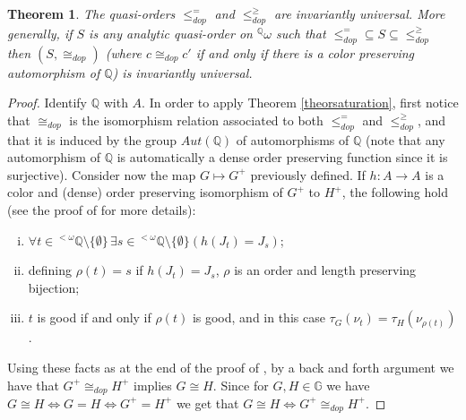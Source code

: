 \documentclass{amsart}
\newtheorem{theorem}{Theorem}[section]
\theoremstyle{definition}
\theoremstyle{remark}
\begin{document}
\begin{theorem}\label{theordopuniversal}
The quasi-orders $\leq_{dop}^=$ and $\leq_{dop}^\geq$ are invariantly
universal. More generally, if $S$ is any analytic quasi-order on
${}^{\mathbb{Q}} \omega$ such that $\leq_{dop}^= \subseteq S \subseteq
\leq_{dop}^\geq$ then $(S, \cong_{dop})$ (where $c \cong_{dop} c'$ if
and only if there is a color preserving automorphism of ${\mathbb{Q}}$) is
invariantly universal.
\end{theorem}

\begin{proof}
 Identify ${\mathbb{Q}}$ with $A$. In order to apply Theorem
 \ref{theorsaturation}, first notice that $\cong_{dop}$ is the
 isomorphism relation associated to both $\leq_{dop}^=$ and
 $\leq_{dop}^\geq$, and that it is induced by the group $Aut({\mathbb{Q}})$ of
 automorphisms of ${\mathbb{Q}}$ (note that any automorphism of ${\mathbb{Q}}$ is
 automatically a dense order preserving function since it is
 surjective). Consider now the map $G \mapsto G^+$ previously
 defined. If $h \colon A \to A$ is a color and (dense) order
 preserving isomorphism of $G^+$ to $H^+$, the following hold (see
 the proof of \cite[Theorem 6]{Camerlo} for more details):
\begin{enumerate}[i)]
 \item $\forall t \in {}^{<\omega} {\mathbb{Q}} \setminus \{ \emptyset \} \,
   \exists s \in {}^{< \omega} {\mathbb{Q}} \setminus \{ \emptyset \} (h(J_t) =
   J_s)$;
\item defining $\rho(t) = s$ if $h(J_t) = J_s$, $\rho$ is an order and
  length preserving bijection;
\item $t$ is good if and only if $\rho(t)$ is good, and in this case
  $\tau_G(\nu_t) = \tau_H(\nu_{\rho(t)})$.
\end{enumerate}
Using these facts as at the end of the proof of \cite[Theorem
6]{Camerlo}, by a back and forth argument we have that $G^+
\cong_{dop} H^+$ implies $G \cong H$. Since for $G,H \in {\mathbb{G}}$ we have
$G \cong H  \iff G =
H \iff G^+ = H^+$ we get that $G \cong H \iff G^+
\cong_{dop} H^+$.


\end{proof}
\end{document}
